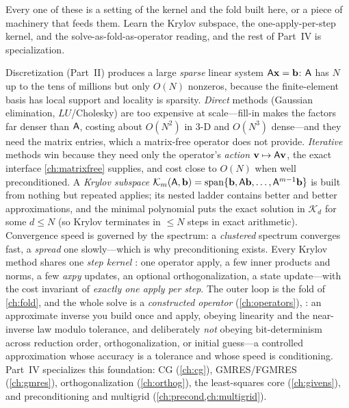 Every one of these is a setting of the kernel and the fold built here, or a piece of
machinery that feeds them. Learn the Krylov subspace, the one-apply-per-step kernel,
and the solve-as-fold-as-operator reading, and the rest of Part~IV is
specialization.

\summarysection
Discretization (Part~II) produces a large \emph{sparse} linear system
$\mathsf{A}\mathbf{x}=\mathbf{b}$: $\mathsf{A}$ has $N$ up to the tens of millions but only $O(N)$
nonzeros, because the finite-element basis has local support and locality is
sparsity. \emph{Direct} methods (Gaussian elimination, $LU$/Cholesky) are too
expensive at scale---fill-in makes the factors far denser than $\mathsf{A}$, costing
about $O(N^2)$ in 3-D and $O(N^3)$ dense---and they need the matrix entries, which a
matrix-free operator does not provide. \emph{Iterative} methods win because they need
only the operator's \emph{action} $\mathbf{v}\mapsto\mathsf{A}\mathbf{v}$, the exact interface
\cref{ch:matrixfree} supplies, and cost close to $O(N)$ when well preconditioned. A
\emph{Krylov subspace} $\mathcal{K}_m(\mathsf{A},\mathbf{b})=\operatorname{span}\{\mathbf{b},\mathsf{A}\mathbf{b},
\dots,\mathsf{A}^{m-1}\mathbf{b}\}$ is built from nothing but repeated applies; its nested
ladder contains better and better approximations, and the minimal polynomial puts the
exact solution in $\mathcal{K}_d$ for some $d\le N$ (so Krylov terminates in $\le N$
steps in exact arithmetic). Convergence speed is governed by the spectrum: a
\emph{clustered} spectrum converges fast, a \emph{spread} one slowly---which is why
preconditioning exists. Every Krylov method shares one \emph{step kernel}
: one operator apply, a few inner products and norms, a few
\emph{axpy} updates, an optional orthogonalization, a state update---with the cost
invariant of \emph{exactly one apply per step}. The outer loop is the
 fold of \cref{ch:fold}, and the whole solve is a
\emph{constructed operator} (\cref{ch:operators}), : an approximate
inverse you build once and apply, obeying linearity and the near-inverse law modulo
tolerance, and deliberately \emph{not} obeying bit-determinism across reduction
order, orthogonalization, or initial guess---a controlled approximation whose
accuracy is a tolerance and whose speed is conditioning. Part~IV specializes this
foundation: CG (\cref{ch:cg}), GMRES/FGMRES (\cref{ch:gmres}), orthogonalization
(\cref{ch:orthog}), the least-squares core (\cref{ch:givens}), and preconditioning
and multigrid (\cref{ch:precond,ch:multigrid}).

